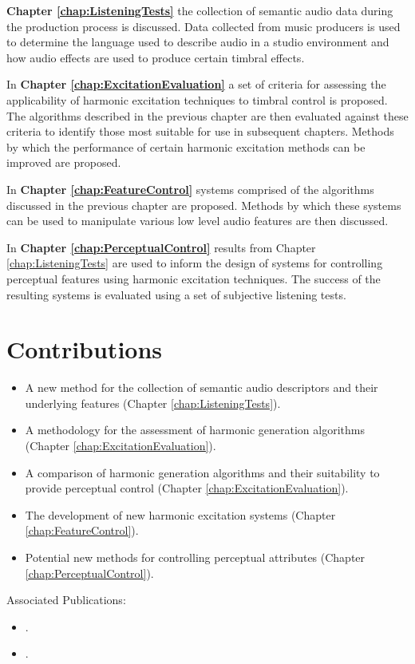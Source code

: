 	{\bf{Chapter \ref{chap:ListeningTests}}} the collection of semantic audio data during the production process is
	discussed. Data collected from music producers is used to determine the language used to describe audio in a studio
	environment and how audio effects are used to produce certain timbral effects.

	In {\bf{Chapter \ref{chap:ExcitationEvaluation}}} a set of criteria for assessing the applicability of
	harmonic excitation techniques to timbral control is proposed. The algorithms described in the previous chapter are
	then evaluated against these criteria to identify those most suitable for use in subsequent chapters. Methods by
	which the performance of certain harmonic excitation methods can be improved are proposed.

	In {\bf{Chapter \ref{chap:FeatureControl}}} systems comprised of the algorithms discussed in the previous
	chapter are proposed. Methods by which these systems can be used to manipulate various low level audio features are
	then discussed.

	In {\bf{Chapter \ref{chap:PerceptualControl}}} results from Chapter \ref{chap:ListeningTests} are used to inform the
	design of systems for controlling perceptual features using harmonic excitation techniques. The success of the
	resulting systems is evaluated using a set of subjective listening tests.

\section{Contributions}
\label{sec:Introduction-Contributions}


	\begin{itemize}
		\item A new method for the collection of semantic audio descriptors and their underlying features (Chapter
		      \ref{chap:ListeningTests}).
		\item A methodology for the assessment of harmonic generation algorithms (Chapter
		      \ref{chap:ExcitationEvaluation}).
		\item A comparison of harmonic generation algorithms and their suitability to provide perceptual control
		      (Chapter \ref{chap:ExcitationEvaluation}).
		\item The development of new harmonic excitation systems (Chapter \ref{chap:FeatureControl}).
		\item Potential new methods for controlling perceptual attributes (Chapter \ref{chap:PerceptualControl}).
	\end{itemize}

	Associated Publications:

	\begin{itemize}
		\item {}.
		\item {}.
	\end{itemize}
